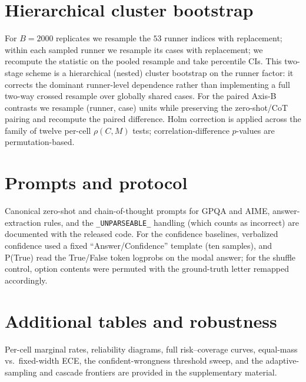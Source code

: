 \documentclass[11pt]{article}
\newcommand{\C}{\textit{C}}
\newcommand{\Mlab}{\textit{M}}
\begin{document}


\appendix
\section{Hierarchical cluster bootstrap}
\label{app:boot}
For $B{=}2000$ replicates we resample the $53$ runner indices with replacement; within each sampled
runner we resample its cases with replacement; we recompute the statistic on the pooled resample and
take percentile CIs. This two-stage scheme is a hierarchical (nested) cluster bootstrap on the runner
factor: it corrects the dominant runner-level dependence rather than implementing a full two-way crossed
resample over globally shared cases. For the paired Axis-B contrasts we resample (runner, case) units while preserving
the zero-shot/CoT pairing and recompute the paired difference. Holm correction is applied across the
family of twelve per-cell $\rho(\C,\Mlab)$ tests; correlation-difference $p$-values are permutation-based.

\section{Prompts and protocol}
\label{app:prompts}
Canonical zero-shot and chain-of-thought prompts for GPQA and AIME, answer-extraction rules, and the
\texttt{\_UNPARSEABLE\_} handling (which counts as incorrect) are documented with the released code.
For the confidence baselines, verbalized confidence used a fixed ``Answer/Confidence'' template
(ten samples), and P(True) read the True/False token logprobs on the modal answer; for the shuffle
control, option contents were permuted with the ground-truth letter remapped accordingly.

\section{Additional tables and robustness}
\label{app:extra}
Per-cell marginal rates, reliability diagrams, full risk--coverage curves, equal-mass vs.\ fixed-width
ECE, the confident-wrongness threshold sweep, and the adaptive-sampling and cascade frontiers are
provided in the supplementary material.
\end{document}
